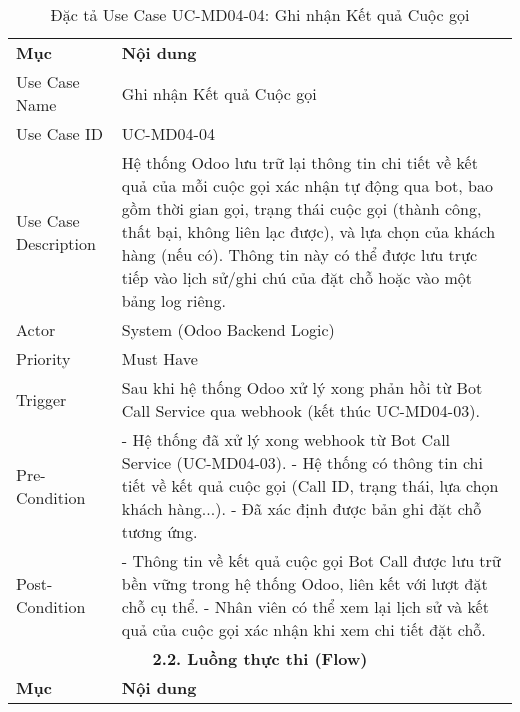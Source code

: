 \begin{longtable}{|m{4cm}|p{11cm}|}
\caption{Đặc tả Use Case UC-MD04-04: Ghi nhận Kết quả Cuộc gọi} \label{tab:uc_md04_04} \\
\hline

\endhead %
\hline
\endfoot %
\hline
\endlastfoot %
\multicolumn{2}{|c|}{\textbf{2.1. Tóm tắt (Summary)}} \\
\hline
\textbf{Mục} & \textbf{Nội dung} \\
\hline
Use Case Name & Ghi nhận Kết quả Cuộc gọi \\
\hline
Use Case ID & UC-MD04-04 \\
\hline
Use Case Description & Hệ thống Odoo lưu trữ lại thông tin chi tiết về kết quả của mỗi cuộc gọi xác nhận tự động qua bot, bao gồm thời gian gọi, trạng thái cuộc gọi (thành công, thất bại, không liên lạc được), và lựa chọn của khách hàng (nếu có). Thông tin này có thể được lưu trực tiếp vào lịch sử/ghi chú của đặt chỗ hoặc vào một bảng log riêng. \\
\hline
Actor & System (Odoo Backend Logic) \\
\hline
Priority & Must Have \\
\hline
Trigger & Sau khi hệ thống Odoo xử lý xong phản hồi từ Bot Call Service qua webhook (kết thúc UC-MD04-03). \\
\hline
Pre-Condition & - Hệ thống đã xử lý xong webhook từ Bot Call Service (UC-MD04-03). \newline - Hệ thống có thông tin chi tiết về kết quả cuộc gọi (Call ID, trạng thái, lựa chọn khách hàng...). \newline - Đã xác định được bản ghi đặt chỗ tương ứng. \\
\hline
Post-Condition & - Thông tin về kết quả cuộc gọi Bot Call được lưu trữ bền vững trong hệ thống Odoo, liên kết với lượt đặt chỗ cụ thể. \newline - Nhân viên có thể xem lại lịch sử và kết quả của cuộc gọi xác nhận khi xem chi tiết đặt chỗ. \\
\hline
\multicolumn{2}{|c|}{\textbf{2.2. Luồng thực thi (Flow)}} \\
\hline
\textbf{Mục} & \textbf{Nội dung} \\
\hline

\end{longtable}

